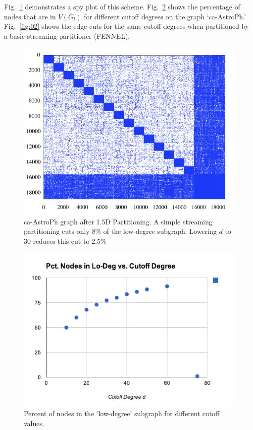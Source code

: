 \documentclass[11pt]{article}
\begin{document}
Fig.~\ref{fig:00} demonstrates a spy plot of this scheme. Fig.~\ref{fig:01} shows the percentage of nodes that are in $V(G_l)$ for different cutoff degrees on the graph `ca-AstroPh.' Fig.~\ref{fig:02} shows the edge cuts for the same cutoff degrees when partitioned by a basic streaming partitioner (FENNEL). 

\begin{figure}[h!]
\centering
\includegraphics[scale=0.50] {figures/litreview/astrophdeg}
\caption[Caption for]{ca-AstroPh graph after 1.5D Partitioning. A simple streaming partitioning cuts only 8\% of the low-degree subgraph. Lowering $d$ to 30 reduces this cut to 2.5\%}
\label{fig:00}
\end{figure}

\begin{figure}[h!]
\centering
\includegraphics[scale=0.50] {figures/litreview/pctnodes}
\caption[Caption for]{Percent of nodes in the `low-degree' subgraph for different cutoff values.}
\label{fig:01}
\end{figure}
\end{document}
